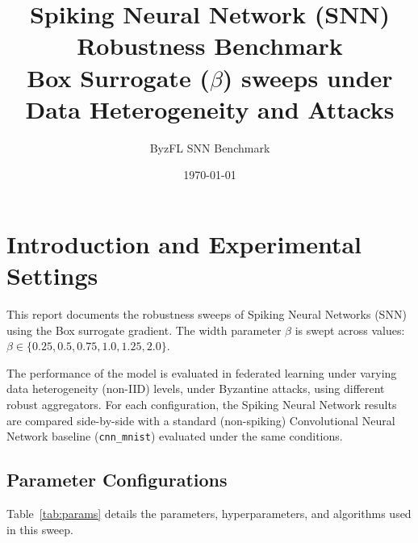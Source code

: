 \documentclass{article}
\title{Spiking Neural Network (SNN) Robustness Benchmark\\Box Surrogate ($\beta$) sweeps under Data Heterogeneity and Attacks}
\author{ByzFL SNN Benchmark}
\date{\today}
\begin{document}
\maketitle

\clearpage
\tableofcontents
\clearpage

\section{Introduction and Experimental Settings}
This report documents the robustness sweeps of Spiking Neural Networks (SNN) using the Box surrogate gradient. The width parameter $\beta$ is swept across values: $\beta \in \{0.25, 0.5, 0.75, 1.0, 1.25, 2.0\}$. 

The performance of the model is evaluated in federated learning under varying data heterogeneity (non-IID) levels, under Byzantine attacks, using different robust aggregators. For each configuration, the Spiking Neural Network results are compared side-by-side with a standard (non-spiking) Convolutional Neural Network baseline (\texttt{cnn\_mnist}) evaluated under the same conditions.


\subsection{Parameter Configurations}
Table~\ref{tab:params} details the parameters, hyperparameters, and algorithms used in this sweep.
\end{document}
